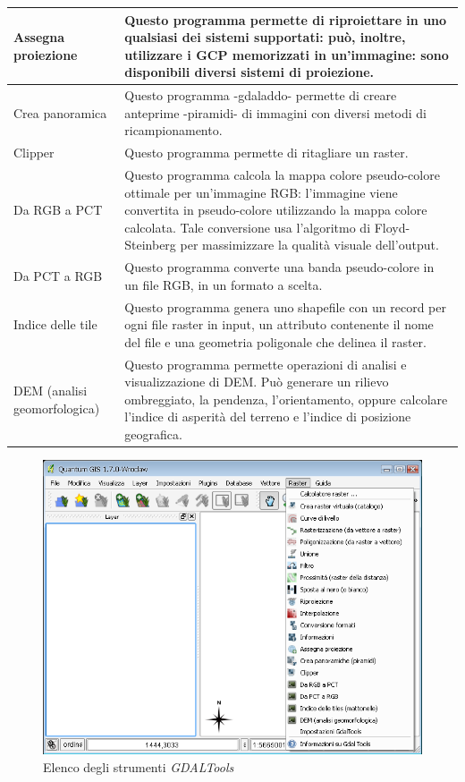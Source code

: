 {\begin{longtable}{|p{3cm}|p{13cm}|}
\hline Assegna proiezione &  Questo programma permette di riproiettare in uno qualsiasi dei sistemi supportati: può, inoltre, 
utilizzare i GCP memorizzati in un'immagine: sono disponibili diversi sistemi di proiezione. \\
\hline Crea panoramica & Questo programma -gdaladdo- permette di creare anteprime -piramidi- di immagini con diversi metodi di ricampionamento. \\
\hline Clipper & Questo programma permette di ritagliare un raster. \\
\hline Da RGB a PCT & Questo programma calcola la mappa colore pseudo-colore ottimale per un'immagine RGB: l'immagine viene convertita
in pseudo-colore utilizzando la mappa colore calcolata. Tale conversione usa l'algoritmo di Floyd-Steinberg per 
massimizzare la qualità visuale dell'output. \\
\hline Da PCT a RGB & Questo programma converte una banda pseudo-colore in un file RGB, in un formato a scelta.\\
\hline Indice delle tile & Questo programma genera uno shapefile con un record per ogni file raster in input, un attributo contenente 
il nome del file e una geometria poligonale che delinea il raster.\\
\hline DEM (analisi geomorfologica) & Questo programma permette operazioni di analisi e visualizzazione di DEM. Può generare un rilievo ombreggiato, 
la pendenza, l'orientamento, oppure calcolare l'indice di asperità del terreno e l'indice di posizione geografica.\\
\hline
\end{longtable}

\begin{figure}
   \centering
   \caption{Elenco degli strumenti \emph{GDALTools} \wincaption}\label{gdaltools_menu}
   \includegraphics[clip=true, width=12cm]{plugins_gdaltools_images/raster_menu}
\end{figure}

}
